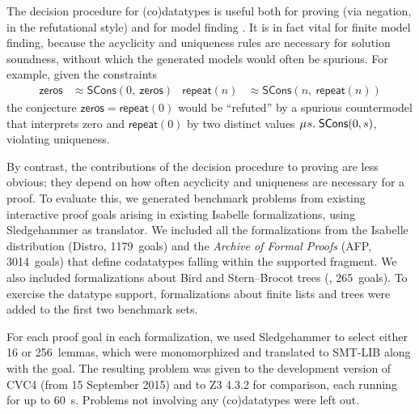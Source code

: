 \documentclass[letter]{article}
\newcommand\MU{\vvthinspace\mu\vvthinspace}
\theoremstyle{plain}
\theoremstyle{definition}
\newcommand\const[1]{\textsf{#1}}
\newcommand{\teq}{\approx}
\newcommand\vvthinspace{\kern+0.041667em}
\begin{document}
The decision procedure for (co)datatypes is useful both for proving (via
negation, in the refutational style) and for model finding
\cite{ge-de-moura-2009,reynolds-et-al-2013}.
It is in fact vital for finite model finding,
because the acyclicity and uniqueness rules are necessary for solution
soundness, without which the generated models would often be
spurious. For example, given the constraints
\begin{align*}
\const{zeros} & \teq \const{SCons}(0,\:\const{zeros})
& \const{repeat}(n) & \teq \const{SCons}(n,\:\const{repeat}(n))
\end{align*}
the conjecture
$\const{zeros} = \const{repeat}(0)$
would be ``refuted'' by a spurious countermodel that interprets
\const{zero} and $\const{repeat}(0)$ by two distinct
values $\MU s.\; \const{SCons}(0, s)$,
violating uniqueness.

By contrast, the contributions of the decision procedure
to proving are less obvious; they depend on how
often acyclicity and uniqueness are necessary for a proof.
To evaluate this,
we generated benchmark problems from existing interactive
proof goals arising in existing
Isabelle formalizations, using Sledgehammer \cite{blanchette-et-al-2013-smt}
as translator.
We
included all the formalizations from the Isabelle distribution (Distro, 1179~goals)
and the \emph{Archive of Formal Proofs} (AFP, 3014~goals) that define codatatypes falling within the supported fragment. We
also included formalizations about Bird and Stern--Brocot trees (\gandl,
265~goals). %
To exercise the datatype support, formalizations about finite
lists and trees
were added to the first two benchmark sets.



For each proof goal in each formalization, we used Sledgehammer to select either 16 or
256~lemmas, which were monomorphized and translated to SMT-LIB along with the
goal. The resulting problem was given to the
development version of CVC4
(from 15 September 2015) and to
Z3 4.3.2 for comparison, each running for
up to 60~s. %
Problems not involving any (co)datatypes were left out.
\end{document}
